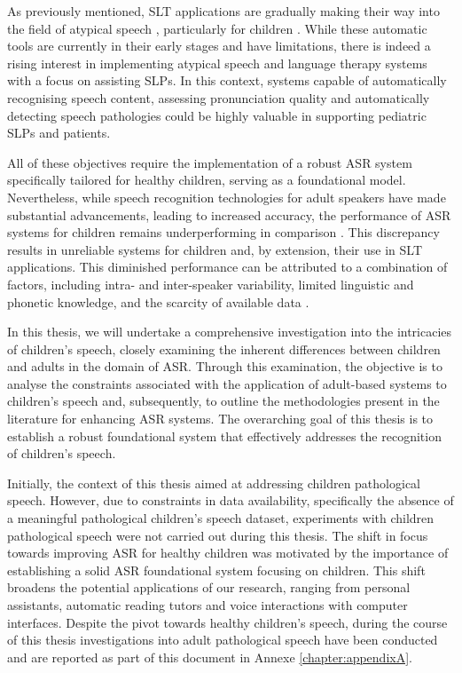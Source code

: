 As previously mentioned, \ac{SLT} applications are gradually making their way into the field of atypical speech \cite{pompili2020evaluation}, particularly for children \cite{albudoor2022identifying}. While these automatic tools are currently in their early stages and have limitations, there is indeed a rising interest in implementing atypical speech and language therapy systems with a focus on assisting \acp{SLP}. In this context, systems capable of automatically recognising speech content, assessing pronunciation quality and automatically detecting speech pathologies could be highly valuable in supporting pediatric \acp{SLP} and patients.

All of these objectives require the implementation of a robust \ac{ASR} system specifically tailored for healthy children, serving as a foundational model. Nevertheless, while speech recognition technologies for adult speakers have made substantial advancements, leading to increased accuracy, the performance of \ac{ASR} systems for children remains underperforming in comparison \cite{reviewASRchildren,sri_end2end,gelin2021endtoend}. This discrepancy results in unreliable systems for children and, by extension, their use in \ac{SLT} applications. This diminished performance can be attributed to a combination of factors, including intra- and inter-speaker variability, limited linguistic and phonetic knowledge, and the scarcity of available data \cite{Acoustic_change_children}.

In this thesis, we will undertake a comprehensive investigation into the intricacies of children's speech, closely examining the inherent differences between children and adults in the domain of \ac{ASR}. Through this examination, the objective is to analyse the constraints associated with the application of adult-based systems to children's speech and, subsequently, to outline the methodologies present in the literature for enhancing \ac{ASR} systems. The overarching goal of this thesis is to establish a robust foundational system that effectively addresses the recognition of children's speech.

Initially, the context of this thesis aimed at addressing children pathological speech. However, due to constraints in data availability, specifically the absence of a meaningful pathological children's speech dataset, experiments with children pathological speech were not carried out during this thesis. 
The shift in focus towards improving \ac{ASR} for healthy children was motivated by the importance of establishing a solid \ac{ASR} foundational system focusing on children. This shift broadens the potential applications of our research, ranging from personal assistants, automatic reading tutors and voice interactions with computer interfaces. Despite the pivot towards healthy children's speech, during the course of this thesis investigations into adult pathological speech have been conducted and are reported as part of this document in Annexe \ref{chapter:appendixA}.


